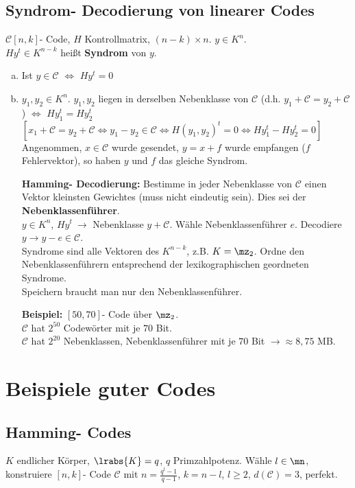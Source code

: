 	\subsection{Syndrom- Decodierung von linearer Codes}
		$ \mathcal{C}[n,k] $- Code, $ H $ Kontrollmatrix, $ (n-k)\times n $. $ y\in K^n $.\\
		$ Hy^t\in K^{n-k} $ heißt \textbf{Syndrom} von $ y $.
		\begin{enumerate}[a)]
			\item Ist $ y\in \mathcal{C} $ $ \Leftrightarrow $ $ Hy^t=0 $
			\item $ y_1,y_2\in K^n $. $ y_1,y_2 $ liegen in derselben Nebenklasse von $ \mathcal{C} $ (d.h. $ y_1+\mathcal{C}=y_2+\mathcal{C} $) $ \Leftrightarrow $ $ Hy_1^t=Hy_2^t $\\
			$ [x_1+\mathcal{C}=y_2+\mathcal{C}\Leftrightarrow y_1-y_2\in \mathcal{C}\Leftrightarrow H(y_1,y_2)^t=0\Leftrightarrow Hy_1^t-Hy_2^t=0] $\\
			Angenommen, $ x\in \mathcal{C} $ wurde gesendet, $ y=x+f $ wurde empfangen ($ f $ Fehlervektor), so haben $ y $ und $f$ das gleiche Syndrom.
			
			\textbf{Hamming- Decodierung:} Bestimme in jeder Nebenklasse von $ \mathcal{C} $ einen Vektor kleinsten Gewichtes (muss nicht eindeutig sein). Dies sei der \textbf{Nebenklassenführer}.\\
			$ y\in K^n $, $ Hy^t\ \rightarrow $ Nebenklasse $ y+\mathcal{C} $. Wähle Nebenklassenführer $ e $. Decodiere $ y\rightarrow y-e\in \mathcal{C} $.\\
			Syndrome sind alle Vektoren des $ K^{n-k} $, z.B. $ K=\mz_2 $. Ordne den Nebenklassenführern entsprechend der lexikographischen geordneten Syndrome.\\
			Speichern braucht man nur den Nebenklassenführer.
			
			\textbf{Beispiel:} $ [50,70] $- Code über $ \mz_2 $.\\
			$ \mathcal{C} $ hat $ 2^{50} $ Codewörter mit je $ 70 $ Bit.\\
			$ \mathcal{C} $ hat $ 2^{20} $ Nebenklassen, Nebenklassenführer mit je $ 70 $ Bit $ \rightarrow\approx 8,75 $ MB.
		\end{enumerate}

\section{Beispiele guter Codes}
	\subsection{Hamming- Codes}
		$ K $ endlicher Körper, $ \lrabs{K}=q $, $ q $ Primzahlpotenz. Wähle $ l\in\mn $, konstruiere $ [n,k] $- Code $ \mathcal{C} $ mit $ n=\frac{q^l-1}{q-1} $, $ k=n-l $, $ l\geq 2 $, $d(\mathcal{C})=3$, perfekt.
		

